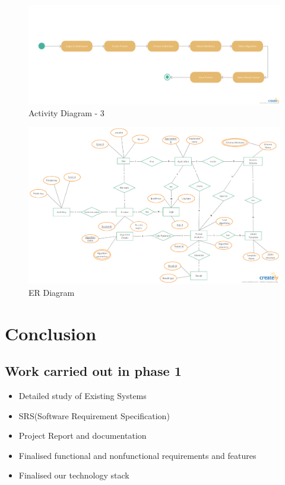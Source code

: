 \documentclass[a4paper,12pt]{report}
\begin{document}
        \begin{figure}[h] \centering
          \includegraphics[width=8.5in , angle=90]{images/PPI.png}
          \caption{ Activity Diagram - 3}  
        \end{figure}

        \newpage
        \begin{figure}[h] \centering
          \includegraphics[width=8.5in ,angle=90]{images/ER.jpg}
        \caption{ ER Diagram}  
        \end{figure}

    \chapter {Conclusion}
    \section{Work carried out in phase 1}
    \begin{itemize}
      \item  Detailed study of Existing Systems
      \item  SRS(Software Requirement Specification)
      \item  Project Report and documentation
      \item  Finalised functional and nonfunctional requirements and features
      \item  Finalised our technology stack
    \end{itemize}
\end{document}
